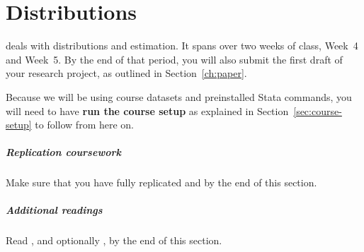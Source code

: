 %
%
\chapter{Distributions}%
	\label{ch:distr}%
  \begin{mybox}
     deals with distributions and estimation. It spans over two weeks of class, Week~4 and Week~5. By the end of that period, you will also submit the first draft of your research project, as outlined in Section~\ref{ch:paper}.%
  
    Because we will be using course datasets and preinstalled Stata commands, you will need to have \textbf{run the course setup} as explained in Section~\ref{sec:course-setup} to follow from here on.%

    \paragraph{Replication coursework}%
    Make sure that you have fully replicated  and  by the end of this section.%

    \paragraph{Additional readings}%
    Read \citeauthor[ch.~4--7]{Urdan:2010a}, and optionally \citeauthor[ch.~2.5--2.6 and 5]{FeinsteinThomas:2002d}, by the end of this section.%
  \end{mybox}
  \startcontents[chapters]%
	\newpage



%
%
%
%
%
%
% 
%


\stopcontents[chapters]
